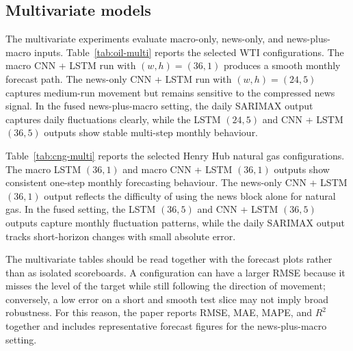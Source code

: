 \documentclass[11pt,a4paper]{article}
\begin{document}
\subsection{Multivariate models}\label{sec:res-multi}

The multivariate experiments evaluate macro-only, news-only, and news-plus-macro inputs. Table~\ref{tab:oil-multi} reports the selected WTI configurations. The macro CNN + LSTM run with $(w,h)=(36,1)$ produces a smooth monthly forecast path. The news-only CNN + LSTM run with $(w,h)=(24,5)$ captures medium-run movement but remains sensitive to the compressed news signal. In the fused news-plus-macro setting, the daily SARIMAX output captures daily fluctuations clearly, while the LSTM $(24,5)$ and CNN + LSTM $(36,5)$ outputs show stable multi-step monthly behaviour.

\begin{table}[h!]
\centering
\caption{Selected multivariate outputs for WTI crude oil.}\label{tab:oil-multi}
\small
{}
\end{table}

Table~\ref{tab:cng-multi} reports the selected Henry Hub natural gas configurations. The macro LSTM $(36,1)$ and macro CNN + LSTM $(36,1)$ outputs show consistent one-step monthly forecasting behaviour. The news-only CNN + LSTM $(36,1)$ output reflects the difficulty of using the news block alone for natural gas. In the fused setting, the LSTM $(36,5)$ and CNN + LSTM $(36,5)$ outputs capture monthly fluctuation patterns, while the daily SARIMAX output tracks short-horizon changes with small absolute error.

The multivariate tables should be read together with the forecast plots rather than as isolated scoreboards. A configuration can have a larger RMSE because it misses the level of the target while still following the direction of movement; conversely, a low error on a short and smooth test slice may not imply broad robustness. For this reason, the paper reports RMSE, MAE, MAPE, and $R^2$ together and includes representative forecast figures for the news-plus-macro setting.
\end{document}
